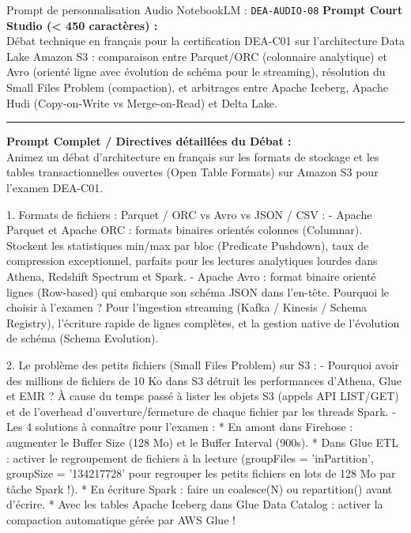 \documentclass[11pt,a4paper]{article}
\begin{document}
\begin{promptbox}{Prompt de personnalisation Audio NotebookLM : \texttt{DEA-AUDIO-08}}
\textbf{Prompt Court Studio (< 450 caractères) :}\\
Débat technique en français pour la certification DEA-C01 sur l'architecture Data Lake Amazon S3 : comparaison entre Parquet/ORC (colonnaire analytique) et Avro (orienté ligne avec évolution de schéma pour le streaming), résolution du Small Files Problem (compaction), et arbitrages entre Apache Iceberg, Apache Hudi (Copy-on-Write vs Merge-on-Read) et Delta Lake.

\medskip\hrule\medskip
\textbf{Prompt Complet / Directives détaillées du Débat :}\\
Animez un débat d'architecture en français sur les formats de stockage et les tables transactionnelles ouvertes (Open Table Formats) sur Amazon S3 pour l'examen DEA-C01.

1. Formats de fichiers : Parquet / ORC vs Avro vs JSON / CSV :
- Apache Parquet et Apache ORC : formats binaires orientés colonnes (Columnar). Stockent les statistiques min/max par bloc (Predicate Pushdown), taux de compression exceptionnel, parfaits pour les lectures analytiques lourdes dans Athena, Redshift Spectrum et Spark.
- Apache Avro : format binaire orienté lignes (Row-based) qui embarque son schéma JSON dans l'en-tête. Pourquoi le choisir à l'examen ? Pour l'ingestion streaming (Kafka / Kinesis / Schema Registry), l'écriture rapide de lignes complètes, et la gestion native de l'évolution de schéma (Schema Evolution).

2. Le problème des petits fichiers (Small Files Problem) sur S3 :
- Pourquoi avoir des millions de fichiers de 10 Ko dans S3 détruit les performances d'Athena, Glue et EMR ? À cause du temps passé à lister les objets S3 (appels API LIST/GET) et de l'overhead d'ouverture/fermeture de chaque fichier par les threads Spark.
- Les 4 solutions à connaître pour l'examen :
  * En amont dans Firehose : augmenter le Buffer Size (128 Mo) et le Buffer Interval (900s).
  * Dans Glue ETL : activer le regroupement de fichiers à la lecture (groupFiles = 'inPartition', groupSize = '134217728' pour regrouper les petits fichiers en lots de 128 Mo par tâche Spark !).
  * En écriture Spark : faire un coalesce(N) ou repartition() avant d'écrire.
  * Avec les tables Apache Iceberg dans Glue Data Catalog : activer la compaction automatique gérée par AWS Glue !


\end{promptbox}
\end{document}
